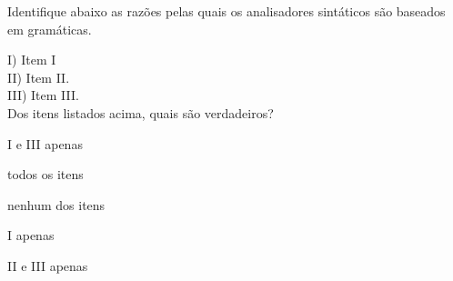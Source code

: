 \question[10]

Identifique abaixo as razões pelas quais os analisadores sintáticos são
baseados em gramáticas.

I) Item I\\
II) Item II.\\
III) Item III.\\

Dos itens listados acima, quais são verdadeiros?\\

\begin{choices}
\item I e III apenas
\item todos os itens %
\item nenhum dos itens
\item I apenas
\item II e III apenas
\end{choices}
\answerline



